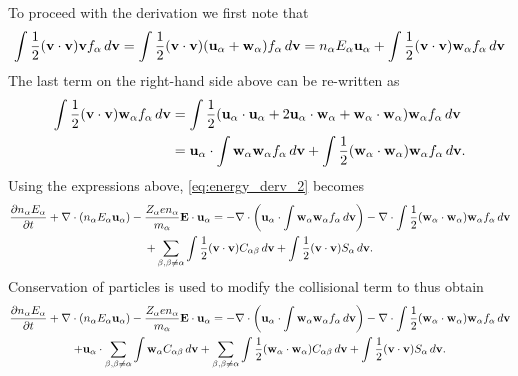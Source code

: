 \documentclass[oneside,a4paper,11pt]{report}
\begin{document}
To proceed with the derivation we first note that
\begin{multline}
\int \frac{1}{2} (\mathbf{v} \cdot \mathbf{v}) \mathbf{v} f_\alpha \, d\mathbf{v} = \int \frac{1}{2} (\mathbf{v} \cdot \mathbf{v}) (\mathbf{u}_\alpha + \mathbf{w}_\alpha) f_\alpha \, d\mathbf{v} = n_\alpha E_\alpha \mathbf{u}_\alpha + \int \frac{1}{2} (\mathbf{v} \cdot \mathbf{v} ) \mathbf{w}_\alpha f_\alpha \, d\mathbf{v}
\end{multline}
The last term on the right-hand side above can be re-written as
\begin{align}
\int \frac{1}{2} ( \mathbf{v} \cdot \mathbf{v} ) \mathbf{w}_\alpha f_\alpha \, d\mathbf{v} &= \int \frac{1}{2} ( \mathbf{u}_\alpha \cdot \mathbf{u}_\alpha + 2\mathbf{u}_\alpha \cdot \mathbf{w}_\alpha + \mathbf{w}_\alpha \cdot \mathbf{w}_\alpha ) \mathbf{w}_\alpha f_\alpha \, d\mathbf{v} \\
& =  \mathbf{u}_\alpha \cdot \int \mathbf{w}_\alpha \mathbf{w}_\alpha f_\alpha \, d\mathbf{v} + \int \frac{1}{2} ( \mathbf{w}_\alpha \cdot \mathbf{w}_\alpha ) \mathbf{w}_\alpha f_\alpha \, d\mathbf{v}.
\end{align}
Using the expressions above, \cref{eq:energy_derv_2} becomes
\begin{multline}
\label{eq:energy_derv_3}
\frac{\partial n_\alpha E_\alpha}{\partial t} + \nabla \cdot (n_\alpha E_\alpha \mathbf{u}_\alpha ) - \frac{Z_\alpha e n_\alpha}{m_\alpha} \mathbf{E} \cdot \mathbf{u}_\alpha =  - \nabla \cdot \left ( \mathbf{u}_\alpha \cdot \int \mathbf{w}_\alpha \mathbf{w}_\alpha f_\alpha \, d\mathbf{v} \right ) - \nabla \cdot \int \frac{1}{2} ( \mathbf{w}_\alpha \cdot \mathbf{w}_\alpha ) \mathbf{w}_\alpha f_\alpha \, d\mathbf{v}\\
+ \sum_{\beta, \beta \ne \alpha} \int \frac{1}{2} (\mathbf{v} \cdot \mathbf{v}) C_{\alpha \beta} \, d\mathbf{v} + \int \frac{1}{2} (\mathbf{v} \cdot \mathbf{v}) S_\alpha \, d\mathbf{v}.
\end{multline}
Conservation of particles is used to modify the collisional term to thus obtain
\begin{multline}
\label{eq:energy_derv_4}
\frac{\partial n_\alpha E_\alpha}{\partial t} + \nabla \cdot (n_\alpha E_\alpha \mathbf{u}_\alpha ) - \frac{Z_\alpha e n_\alpha}{m_\alpha} \mathbf{E} \cdot \mathbf{u}_\alpha = - \nabla \cdot \left ( \mathbf{u}_\alpha \cdot \int \mathbf{w}_\alpha \mathbf{w}_\alpha f_\alpha \, d\mathbf{v}  \right ) - \nabla \cdot \int \frac{1}{2} ( \mathbf{w}_\alpha \cdot \mathbf{w}_\alpha ) \mathbf{w}_\alpha f_\alpha \, d\mathbf{v} \\
+ \mathbf{u}_\alpha \cdot \sum_{\beta,\beta \ne \alpha} \int \mathbf{w}_\alpha C_{\alpha \beta} \, d\mathbf{v} + \sum_{\beta, \beta \ne \alpha} \int \frac{1}{2} (\mathbf{w}_\alpha \cdot \mathbf{w}_\alpha) C_{\alpha \beta} \, d\mathbf{v} + \int \frac{1}{2} (\mathbf{v} \cdot \mathbf{v}) S_\alpha \, d\mathbf{v}.
\end{multline}
\end{document}
